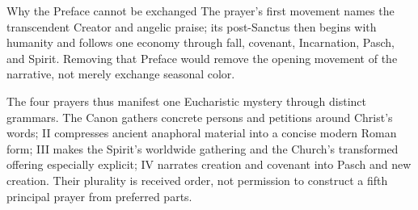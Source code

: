 \begin{studybox}{Why the Preface cannot be exchanged}
The prayer's first movement names the transcendent Creator and angelic praise; its post-Sanctus then begins with humanity and follows one economy through fall, covenant, Incarnation, Pasch, and Spirit. Removing that Preface would remove the opening movement of the narrative, not merely exchange seasonal color.
\end{studybox}

The four prayers thus manifest one Eucharistic mystery through distinct grammars. The Canon gathers concrete persons and petitions around Christ's words; II compresses ancient anaphoral material into a concise modern Roman form; III makes the Spirit's worldwide gathering and the Church's transformed offering especially explicit; IV narrates creation and covenant into Pasch and new creation. Their plurality is received order, not permission to construct a fifth principal prayer from preferred parts.
